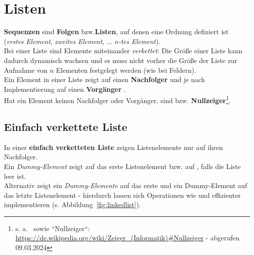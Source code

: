 \section{Listen}

\textbf{Sequenzen} sind \textbf{Folgen} bzw.\textbf{Listen}, auf denen eine Ordnung definiert ist (\textit{erstes Element}, \textit{zweites Element}, ... \textit{n-tes Element}).\\

\noindent
Bei einer Liste sind Elemente miteinander \textit{verkettet}: Die Größe einer Liste kann dadurch dynamisch wachsen und es muss nicht vorher die Größe der Liste zur Aufnahme von $n$ Elementen festgelegt werden (wie bei Feldern).\\

\noindent
Ein Element in einer Liste zeigt auf einen \textbf{Nachfolger}  und je nach Implementierung auf einen \textbf{Vorgänger} .\\
Hat ein Element keinen Nachfolger oder Vorgänger, sind  bzw.  \textbf{Nullzeiger}\footnote{
s. a.~\cite[49 f.]{GD18b} sowie ``Nullzeiger``: \url{https://de.wikipedia.org/wiki/Zeiger_(Informatik)#Nullzeiger} - abgerufen 09.03.2024
}.

\subsection{Einfach verkettete Liste}
In einer \textbf{einfach verketteten Liste} zeigen Listenelemente nur auf ihren Nachfolger.\\

\noindent
Ein \textit{Dummy-Element}  zeigt auf das erste Listenelement bzw. auf , falls die Liste leer ist.\\

\noindent
Alternativ zeigt ein \textit{Dummy-Elemente}  auf das erste und ein Dummy-Element  auf das letzte Listenelement - hierdurch lassen sich Operationen wie  und  effizienter implementieren (s. Abbildung~\ref{fig:linkedlist}).

